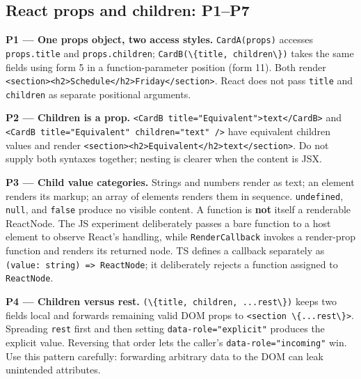 \documentclass[
  10pt,
]{article}
\newcommand{\passthrough}[1]{#1}
\begin{document}
\subsection{React props and children:
P1--P7}\label{react-props-and-children-p1p7}

\textbf{P1 --- One props object, two access styles.}
\passthrough{\lstinline!CardA(props)!} accesses
\passthrough{\lstinline!props.title!} and
\passthrough{\lstinline!props.children!};
\passthrough{\lstinline!CardB(\{title, children\})!} takes the same
fields using form 5 in a function-parameter position (form 11). Both
render
\passthrough{\lstinline!<section><h2>Schedule</h2>Friday</section>!}.
React does not pass \passthrough{\lstinline!title!} and
\passthrough{\lstinline!children!} as separate positional arguments.

\textbf{P2 --- Children is a prop.}
\passthrough{\lstinline!<CardB title="Equivalent">text</CardB>!} and
\passthrough{\lstinline!<CardB title="Equivalent" children="text" />!}
have equivalent children values and render
\passthrough{\lstinline!<section><h2>Equivalent</h2>text</section>!}. Do
not supply both syntaxes together; nesting is clearer when the content
is JSX.

\textbf{P3 --- Child value categories.} Strings and numbers render as
text; an element renders its markup; an array of elements renders them
in sequence. \passthrough{\lstinline!undefined!},
\passthrough{\lstinline!null!}, and \passthrough{\lstinline!false!}
produce no visible content. A function is \textbf{not} itself a
renderable ReactNode. The JS experiment deliberately passes a bare
function to a host element to observe React's handling, while
\passthrough{\lstinline!RenderCallback!} invokes a render-prop function
and renders its returned node. TS defines a callback separately as
\passthrough{\lstinline!(value: string) => ReactNode!}; it deliberately
rejects a function assigned to \passthrough{\lstinline!ReactNode!}.

\textbf{P4 --- Children versus rest.}
\passthrough{\lstinline!(\{title, children, ...rest\})!} keeps two
fields local and forwards remaining valid DOM props to
\passthrough{\lstinline!<section \{...rest\}>!}. Spreading
\passthrough{\lstinline!rest!} first and then setting
\passthrough{\lstinline!data-role="explicit"!} produces the explicit
value. Reversing that order lets the caller's
\passthrough{\lstinline!data-role="incoming"!} win. Use this pattern
carefully: forwarding arbitrary data to the DOM can leak unintended
attributes.
\end{document}
